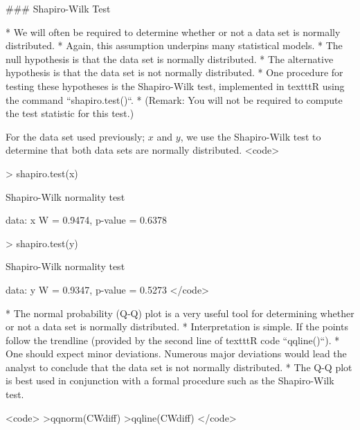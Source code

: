 
### Shapiro-Wilk Test

*  We will often be required to determine whether or not a data set is normally distributed.
*  Again, this assumption underpins many statistical models.
*  The null hypothesis is that the data set is normally distributed.
*  The alternative hypothesis is that the data set is not normally distributed.
*  One procedure for testing these hypotheses is the Shapiro-Wilk test, implemented in texttt{R} using the command ``shapiro.test()``.
*  (Remark: You will not be required to compute the test statistic for this test.)

For the data set used previously; $x$ and $y$, we use the Shapiro-Wilk test to determine that both data sets are normally distributed.
<code>

> shapiro.test(x)

        Shapiro-Wilk normality test

data:  x
W = 0.9474, p-value = 0.6378

> shapiro.test(y)

        Shapiro-Wilk normality test

data:  y
W = 0.9347, p-value = 0.5273
</code>

*  The normal probability (Q-Q) plot is a very useful tool for determining whether or not a data set is normally distributed.
*  Interpretation is simple. If the points follow the trendline (provided by the second line of texttt{R} code ``qqline()``).
*  One should expect minor deviations. Numerous major deviations would lead the analyst to conclude that the data set is not normally distributed.
*  The Q-Q plot is best used in conjunction with a formal procedure such as the Shapiro-Wilk test.


<code>
>qqnorm(CWdiff)
>qqline(CWdiff)
</code>



